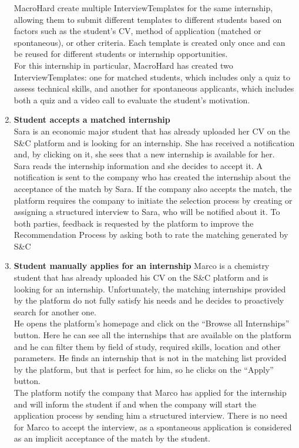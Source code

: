 \begin{enumerate}
        MacroHard create multiple InterviewTemplates for the same internship, allowing them to submit different templates to different students based on factors such as the student’s CV, method of application (matched or spontaneous), or other criteria. Each template is created only once and can be reused for different students or internship opportunities.\\
        For this internship in particular, MacroHard has created two InterviewTemplates: one for matched students, which includes only a quiz to assess technical skills, and another for spontaneous applicants, which includes both a quiz and a video call to evaluate the student’s motivation.
    \item \textbf{\textcolor{titleColor}{Student accepts a matched internship}}\\
        Sara is an economic major student that has already uploaded her CV on the S\&C platform and is looking for an internship. She has received a notification and, by clicking on it, she sees that a new internship is available for her.\\
        Sara reads the internship information and she decides to accept it. A notification is sent to the company who has created the internship about the acceptance of the match by Sara. If the company also accepts the match, the platform requires the company to initiate the selection process by creating or assigning a structured interview to Sara, who will be notified about it.
        To both parties, feedback is requested by the platform to improve the Recommendation Process by asking both to rate the matching generated by S\&C  
    \item \textbf{\textcolor{titleColor}{Student manually applies for an internship}}  
        Marco is a chemistry student that has already uploaded his CV on the S\&C platform and is looking for an internship. Unfortunately, the matching internships provided by the platform do not fully satisfy his needs and he decides to proactively search for another one.\\
        He opens the platform's homepage and click on the “Browse all Internships” button. Here he can see all the internships that are available on the platform and he can filter them by field of study, required skills, location and other parameters.
        He finds an internship that is not in the matching list provided by the platform, but that is perfect for him, so he clicks on the “Apply” button.\\
        The platform notify the company that Marco has applied for the internship and will inform the student if and when the company will start the application process by sending him a structured interview. There is no need for Marco to accept the interview, as a spontaneous application is considered as an implicit acceptance of the match by the student.

\end{enumerate}
